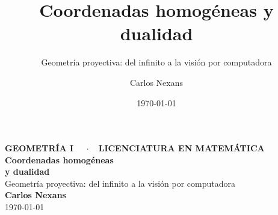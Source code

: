 \documentclass[aspectratio=169]{beamer}
\title[Coordenadas homogéneas y dualidad]{Coordenadas homogéneas y dualidad}
\subtitle{Geometría proyectiva: del infinito a la visión por computadora}
\author{Carlos Nexans}
\institute[Geometría I]{\small Geometría I \;$\cdot$\; Licenciatura en Matemática}
\date{\today}
\begin{document}
{
\begin{frame}[plain]
  \vspace{0.6cm}
  \begin{center}
    {\color{oro!85!white}\footnotesize\bfseries
      GEOMETRÍA I \ \ {\color{azul!40!white}$\cdot$}\ \
      LICENCIATURA EN MATEMÁTICA}\\[1.0cm]
    {\color{white}\Huge\bfseries Coordenadas homogéneas}\\[0.25cm]
    {\color{white}\Huge\bfseries y dualidad}\\[0.5cm]
    {\color{oro!85!white}\large Geometría proyectiva: del infinito a la
      visión por computadora}\\[1.3cm]
    {\color{white}\large\bfseries Carlos Nexans}\\[0.2cm]
    {\color{gris!60!white}\small \today}
  \end{center}
\end{frame}
}
\end{document}
